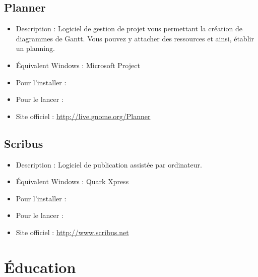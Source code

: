 \subsection{Planner}
\begin{itemize}
\begingroup
{}
\item Description : Logiciel de gestion de projet vous permettant la création de diagrammes de Gantt. Vous pouvez y attacher des ressources et ainsi, établir un planning.{\par}
\item Équivalent Windows : Microsoft Project{\par}
\item Pour l'installer : 
\item Pour le lancer : 
\item Site officiel : \url{http://live.gnome.org/Planner}{\par}
\endgroup
\end{itemize}
\subsection{Scribus}
\begin{itemize}
\begingroup
{}
\item Description : Logiciel de publication assistée par ordinateur.{\par}
\item Équivalent Windows : Quark Xpress{\par}
\item Pour l'installer : 
\item Pour le lancer : 
\item Site officiel : \url{http://www.scribus.net}{\par}
\endgroup
\end{itemize}

\section{Éducation}
